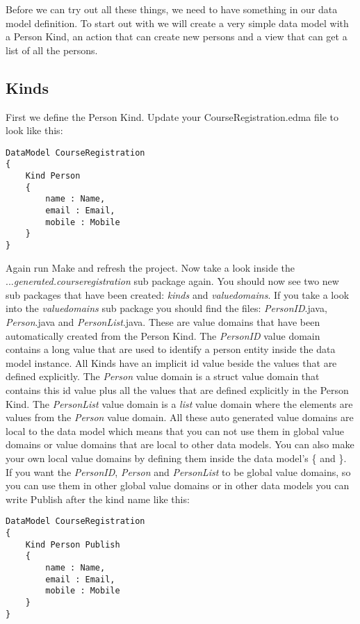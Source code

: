 Before we can try out all these things, we need to have something
in our data model definition. To start out with we will create a very
simple data model with a Person Kind, an action that can create new
persons and a view that can get a list of all the persons.


\subsection{Kinds}

First we define the Person Kind. Update your CourseRegistration.edma
file to look like this:

\begin{lstlisting}[basicstyle={\scriptsize}]
DataModel CourseRegistration
{
	Kind Person
	{
		name : Name,
		email : Email,
		mobile : Mobile
	}
}
\end{lstlisting}


Again run Make and refresh the project. Now take a look inside the
...\emph{generated.courseregistration} sub package again. You should
now see two new sub packages that have been created: \emph{kinds}
and \emph{valuedomains}. If you take a look into the \emph{valuedomains}
sub package you should find the files: \emph{PersonID}.java, \emph{Person}.java
and \emph{PersonList}.java. These are value domains that have been
automatically created from the Person Kind. The \emph{PersonID} value
domain contains a long value that are used to identify a person entity
inside the data model instance. All Kinds have an implicit id value
beside the values that are defined explicitly. The \emph{Person} value
domain is a struct value domain that contains this id value plus all
the values that are defined explicitly in the Person Kind. The \emph{PersonList}
value domain is a \emph{list} value domain where the elements are
values from the \emph{Person} value domain. All these auto generated
value domains are local to the data model which means that you can
not use them in global value domains or value domains that are local
to other data models. You can also make your own local value domains
by defining them inside the data model's \{ and \}. If you want the
\emph{PersonID}, \emph{Person} and \emph{PersonList} to be global
value domains, so you can use them in other global value domains or
in other data models you can write Publish after the kind name like
this:

\begin{lstlisting}[basicstyle={\scriptsize}]
DataModel CourseRegistration
{
	Kind Person Publish
	{
		name : Name,
		email : Email,
		mobile : Mobile
	}
}
\end{lstlisting}



